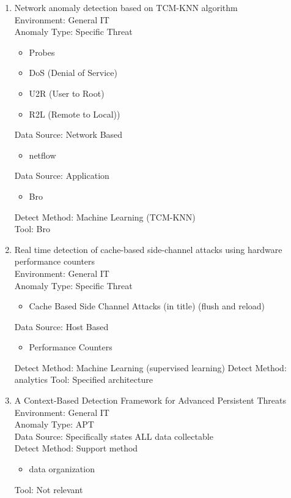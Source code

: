 \documentclass[10pt]{IEEEtran}
\begin{document}
\begin{enumerate}
    
    \item
    Network anomaly detection based on TCM-KNN algorithm\cite{li2007network}\\
    Environment: General IT\\
    Anomaly Type: Specific Threat
    \begin{itemize}
        \item Probes
        \item DoS (Denial of Service)
        \item U2R (User to Root)
        \item R2L (Remote to Local))\\
    \end{itemize}
    Data Source: Network Based
    \begin{itemize}
        \item netflow
    \end{itemize}
    Data Source: Application
    \begin{itemize}
        \item Bro
    \end{itemize}
    Detect Method:  Machine Learning (TCM-KNN)\\
    Tool: Bro
    
    \item
    Real time detection of cache-based side-channel attacks using hardware performance counters\cite{chiappetta2016real}\\
    Environment: General IT\\
    Anomaly Type: Specific Threat
    \begin{itemize}
        \item Cache Based Side Channel Attacks (in title) (flush and reload)
    \end{itemize}
    Data Source: Host Based
    \begin{itemize}
        \item Performance Counters
    \end{itemize}
    Detect Method: Machine Learning (supervised learning) 
    Detect Method: analytics
    Tool: Specified architecture
    
    \item
    A Context-Based Detection Framework for Advanced Persistent Threats\cite{giura2012context}\\
    Environment: General IT\\
    Anomaly Type: APT\\
    Data Source: Specifically states ALL data collectable \\
    Detect Method: Support method
    \begin{itemize}
        \item data organization
    \end{itemize}
    Tool: Not relevant
    

\end{enumerate}
\end{document}
